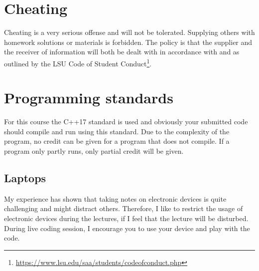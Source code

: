 \documentclass[11pt,letterpaper]{article}
\begin{document}
\section*{Cheating}
Cheating is a very serious offense and will not be tolerated. Supplying others with homework solutions or materials is forbidden. The  policy  is  that  the supplier and the receiver of information will both be dealt with in accordance with and as outlined by the LSU Code of Student Conduct\footnote{\url{https://www.lsu.edu/saa/students/codeofconduct.php}}.

\section*{Programming standards}
For this course the C++17 standard is used and obviously your submitted code should compile and run using this standard. Due to the complexity of the program, no credit can be given for a program that does not compile. If a program only partly runs, only partial credit will be given.

\subsection*{Laptops}
My experience has shown that taking notes on electronic devices is quite challenging and might distract others. Therefore, I like to restrict the usage of electronic devices during the lectures, if I feel that the lecture will be disturbed. During live coding session, I encourage you to use your device and play with the code.


\doclicenseThis
\end{document}
